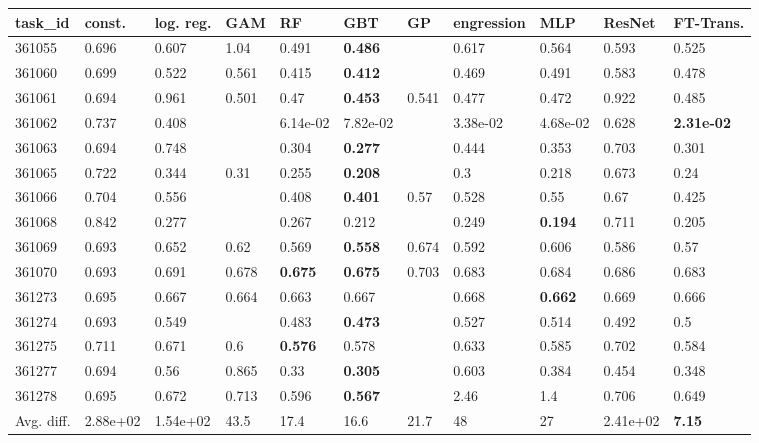 \begin{table}[ht!]
\centering
\begingroup\footnotesize
\begin{tabular}{lllllllllll}
  \hline
\hline
task\_id & const. & log. reg. & GAM & RF & GBT & GP & engression & MLP & ResNet & FT-Trans. \\ 
  \hline
361055 & 0.696 & 0.607 & 1.04 & 0.491 & \textbf{0.486} &  & 0.617 & 0.564 & 0.593 & 0.525 \\ 
  361060 & 0.699 & 0.522 & 0.561 & 0.415 & \textbf{0.412} &  & 0.469 & 0.491 & 0.583 & 0.478 \\ 
  361061 & 0.694 & 0.961 & 0.501 & 0.47 & \textbf{0.453} & 0.541 & 0.477 & 0.472 & 0.922 & 0.485 \\ 
  361062 & 0.737 & 0.408 &  & 6.14e-02 & 7.82e-02 &  & 3.38e-02 & 4.68e-02 & 0.628 & \textbf{2.31e-02} \\ 
  361063 & 0.694 & 0.748 &  & 0.304 & \textbf{0.277} &  & 0.444 & 0.353 & 0.703 & 0.301 \\ 
  361065 & 0.722 & 0.344 & 0.31 & 0.255 & \textbf{0.208} &  & 0.3 & 0.218 & 0.673 & 0.24 \\ 
  361066 & 0.704 & 0.556 &  & 0.408 & \textbf{0.401} & 0.57 & 0.528 & 0.55 & 0.67 & 0.425 \\ 
  361068 & 0.842 & 0.277 &  & 0.267 & 0.212 &  & 0.249 & \textbf{0.194} & 0.711 & 0.205 \\ 
  361069 & 0.693 & 0.652 & 0.62 & 0.569 & \textbf{0.558} & 0.674 & 0.592 & 0.606 & 0.586 & 0.57 \\ 
  361070 & 0.693 & 0.691 & 0.678 & \textbf{0.675} & \textbf{0.675} & 0.703 & 0.683 & 0.684 & 0.686 & 0.683 \\ 
  361273 & 0.695 & 0.667 & 0.664 & 0.663 & 0.667 &  & 0.668 & \textbf{0.662} & 0.669 & 0.666 \\ 
  361274 & 0.693 & 0.549 &  & 0.483 & \textbf{0.473} &  & 0.527 & 0.514 & 0.492 & 0.5 \\ 
  361275 & 0.711 & 0.671 & 0.6 & \textbf{0.576} & 0.578 &  & 0.633 & 0.585 & 0.702 & 0.584 \\ 
  361277 & 0.694 & 0.56 & 0.865 & 0.33 & \textbf{0.305} &  & 0.603 & 0.384 & 0.454 & 0.348 \\ 
  361278 & 0.695 & 0.672 & 0.713 & 0.596 & \textbf{0.567} &  & 2.46 & 1.4 & 0.706 & 0.649 \\ 
   \hline
Avg. diff. & 2.88e+02 & 1.54e+02 & 43.5 & 17.4 & 16.6 & 21.7 & 48 & 27 & 2.41e+02 & \textbf{7.15} \\ 

\end{tabular}
\end{table}
